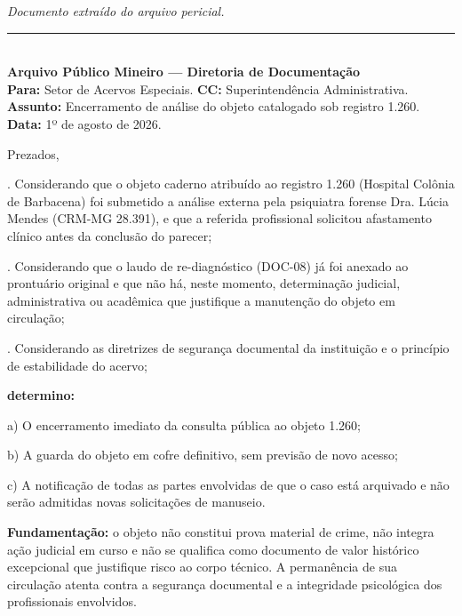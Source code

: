 
\noindent \textit{Documento extraído do arquivo pericial.}

\vspace{0.5em}\noindent\rule{\textwidth}{0.5pt}\vspace{0.5em}

\\[-0.2em]

\noindent \textbf{Arquivo Público Mineiro --- Diretoria de Documentação}\\
\noindent \textbf{Para:} Setor de Acervos Especiais. \textbf{CC:} Superintendência Administrativa.\\
\noindent \textbf{Assunto:} Encerramento de análise do objeto catalogado sob registro 1.260.\\
\noindent\textbf{Data:} 1º de agosto de 2026.

\noindent Prezados,

. Considerando que o objeto caderno atribuído ao registro 1.260 (Hospital Colônia de Barbacena) foi submetido a análise externa pela psiquiatra forense Dra. Lúcia Mendes (CRM-MG 28.391), e que a referida profissional solicitou afastamento clínico antes da conclusão do parecer;

. Considerando que o laudo de re-diagnóstico (DOC-08) já foi anexado ao prontuário original e que não há, neste momento, determinação judicial, administrativa ou acadêmica que justifique a manutenção do objeto em circulação;

. Considerando as diretrizes de segurança documental da instituição e o princípio de estabilidade do acervo;

\noindent \textbf{determino:}

\noindent a) O encerramento imediato da consulta pública ao objeto 1.260;

\noindent b) A guarda do objeto em cofre definitivo, sem previsão de novo acesso;

\noindent c) A notificação de todas as partes envolvidas de que o caso está arquivado e não serão admitidas novas solicitações de manuseio.

\noindent \textbf{Fundamentação:} o objeto não constitui prova material de crime, não integra ação judicial em curso e não se qualifica como documento de valor histórico excepcional que justifique risco ao corpo técnico. A permanência de sua circulação atenta contra a segurança documental e a integridade psicológica dos profissionais envolvidos.

